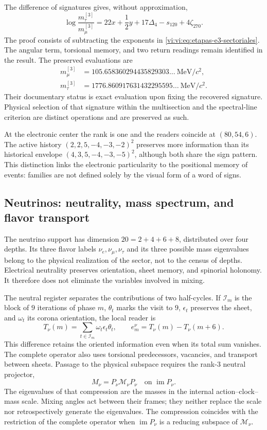 The difference of signatures gives, without approximation,
\begin{equation}
 \log\frac{m_\tau^{[3]}}{m_\mu^{[3]}}
 =22x+\frac12y+17\Delta_4-s_{120}+4\zeta_{270}.
 \label{vi:vi:eq:razon-tau-muon}
\end{equation}
The proof consists of subtracting the exponents in
\eqref{vi:vi:eq:etapas-e3-sectoriales}. The angular term, torsional
memory, and two return readings remain identified in the
result. The preserved evaluations are
\begin{align*}
 m_\mu^{[3]}&=105.658360294435829303\ldots\ \mathrm{MeV}/c^2,\\
 m_\tau^{[3]}&=1776.860917631432295595\ldots\ \mathrm{MeV}/c^2.
\end{align*}
Their documentary status is exact evaluation upon fixing the recovered signature.
Physical selection of that signature within the multisection and the spectral-line
criterion are distinct operations and are preserved as such.

At the electronic center the rank is one and the readers coincide at
\((80,54,6)\). The active history
\((2,2,5,-4,-3,-2)^2\) preserves more information than its historical
envelope \((4,3,5,-4,-3,-5)^2\), although both share the sign
pattern. This distinction links the electronic particularity to the
positional memory of events: families are not defined solely by
the visual form of a word of signs.

\subsection{Neutrinos: neutrality, mass spectrum, and flavor transport}
\label{vi:vi:subsec:neutrinos-familias}

The neutrino support has dimension \(20=2+4+6+8\), distributed over
four depths. Its three flavor labels
\(\nu_e,\nu_\mu,\nu_\tau\) and its three possible mass eigenvalues
belong to the physical realization of the sector, not to the census of
depths. Electrical neutrality preserves orientation,
sheet memory, and spinorial holonomy. It therefore does not eliminate the
variables involved in mixing.

The neutral register separates the contributions of two half-cycles. If
\(\mathcal I_m\) is the block of \(9\) iterations of phase \(m\),
\(\theta_t\) marks the visit to \(9\), \(\epsilon_t\) preserves the sheet,
and \(\omega_t\) its corona orientation, the local reader is
\[
 T_\nu(m)=\sum_{t\in\mathcal I_m}\omega_t\epsilon_t\theta_t,
 \qquad e_m^\nu=T_\nu(m)-T_\nu(m+6).
\]
This difference retains the oriented information even when its total
sum vanishes. The complete operator also uses torsional
predecessors, vacancies, and transport between sheets. Passage to the
physical subspace requires the rank-\(3\) neutral projector,
\[
 M_\nu=P_\nu\mathcal M_\nu P_\nu
 \quad\text{on }\operatorname{im}P_\nu.
\]
The eigenvalues of that compression are the masses in the internal
action--clock--mass scale. Mixing angles act between their frames;
they neither replace the scale nor retrospectively generate the eigenvalues.
The compression coincides with the restriction of the complete operator when
\(\operatorname{im}P_\nu\) is a reducing subspace of
\(\mathcal M_\nu\).


